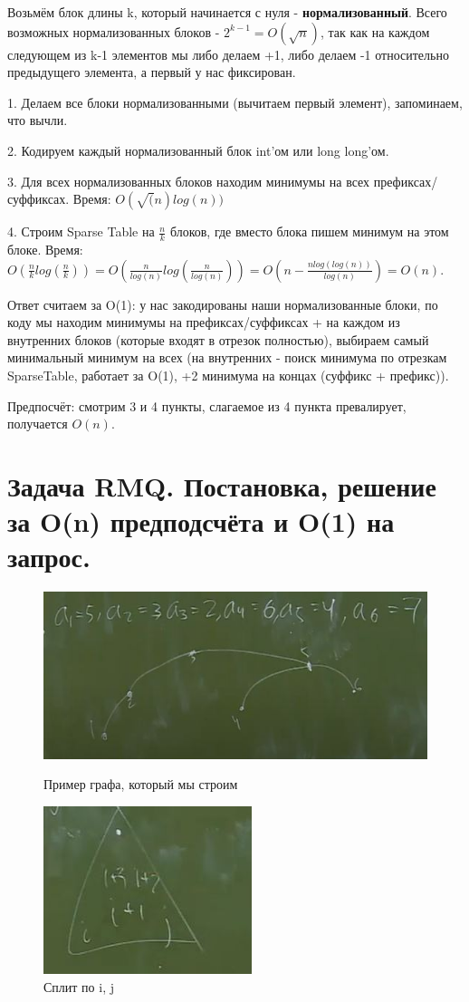 Возьмём блок длины k, который начинается с нуля - \textbf{нормализованный}. Всего возможных нормализованных блоков - $2^{k-1} = O(\sqrt{n})$, так как на каждом следующем из k-1 элементов мы либо делаем +1, либо делаем -1 относительно предыдущего элемента, а первый у нас фиксирован.

1. Делаем все блоки нормализованными (вычитаем первый элемент), запоминаем, что вычли.

2. Кодируем каждый нормализованный блок int'ом или long long'ом.

3. Для всех нормализованных блоков находим минимумы на всех префиксах/суффиксах. Время: $O(\sqrt(n) log(n))$

4. Строим Sparse Table на $\frac{n}{k}$ блоков, где вместо блока пишем минимум на этом блоке. Время: $O(\frac{n}{k} log(\frac{n}{k})) = O(\frac{n}{log(n)} log(\frac{n}{log(n)})) = O(n - \frac{nlog(log(n))}{log(n)}) = O(n)$.

Ответ считаем за O(1): у нас закодированы наши нормализованные блоки, по коду мы находим минимумы на префиксах/суффиксах + на каждом из внутренних блоков (которые входят в отрезок полностью), выбираем самый минимальный минимум на всех (на внутренних - поиск минимума по отрезкам SparseTable, работает за O(1), +2 минимума на концах (суффикс + префикс)).

Предпосчёт: смотрим 3 и 4 пункты, слагаемое из 4 пункта превалирует, получается $O(n)$.

\newpage

\setcounter{section}{98}
\section{Задача RMQ. Постановка, решение за O(n) предподсчёта и O(1) на запрос.}

\begin{figure}[!htb]
   \begin{minipage}{.5\textwidth}
     \centering
     \includegraphics[height = 3 cm]{images/96-99_rmq}
     \caption{Пример графа, который мы строим}
   \end{minipage}\hfill
    \begin{minipage}{.5\textwidth}
     \centering
     \includegraphics[height = 3 cm]{images/96-99_rmq2}
     \caption{Сплит по i, j}
   \end{minipage}
\end{figure}

